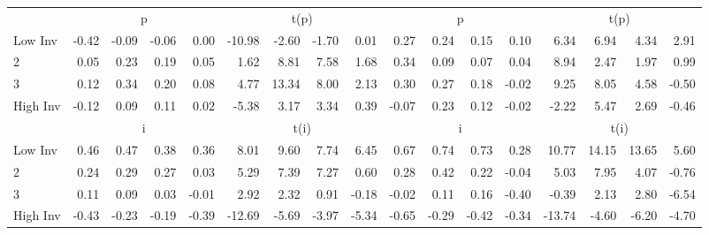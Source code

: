 \begin{table}[!ht]
\begin{tabular}{lrrrrrrrrrrrrrrrr}
  
    
      & \multicolumn{4}{c}{p} & \multicolumn{4}{c}{t(p)}
    
      & \multicolumn{4}{c}{p} & \multicolumn{4}{c}{t(p)}
    
    \\
      \cmidrule(r){2-5} \cmidrule(r){6-9} \cmidrule(r){10-13} \cmidrule(r){14-17}

    Low Inv   & -0.42  & -0.09  & -0.06  & 0.00  & -10.98  & -2.60  & -1.70  & 0.01  & 0.27  & 0.24  & 0.15  & 0.10  & 6.34  & 6.94  & 4.34  & 2.91  \\
           2  & 0.05  & 0.23  & 0.19  & 0.05  & 1.62  & 8.81  & 7.58  & 1.68  & 0.34  & 0.09  & 0.07  & 0.04  & 8.94  & 2.47  & 1.97  & 0.99  \\
           3  & 0.12  & 0.34  & 0.20  & 0.08  & 4.77  & 13.34  & 8.00  & 2.13  & 0.30  & 0.27  & 0.18  & -0.02  & 9.25  & 8.05  & 4.58  & -0.50  \\
    High Inv  & -0.12  & 0.09  & 0.11  & 0.02  & -5.38  & 3.17  & 3.34  & 0.39  & -0.07  & 0.23  & 0.12  & -0.02  & -2.22  & 5.47  & 2.69  & -0.46  \\

  
    
      & \multicolumn{4}{c}{i} & \multicolumn{4}{c}{t(i)}
    
      & \multicolumn{4}{c}{i} & \multicolumn{4}{c}{t(i)}
    
    \\
      \cmidrule(r){2-5} \cmidrule(r){6-9} \cmidrule(r){10-13} \cmidrule(r){14-17}

    Low Inv   & 0.46  & 0.47  & 0.38  & 0.36  & 8.01  & 9.60  & 7.74  & 6.45  & 0.67  & 0.74  & 0.73  & 0.28  & 10.77  & 14.15  & 13.65  & 5.60  \\
           2  & 0.24  & 0.29  & 0.27  & 0.03  & 5.29  & 7.39  & 7.27  & 0.60  & 0.28  & 0.42  & 0.22  & -0.04  & 5.03  & 7.95  & 4.07  & -0.76  \\
           3  & 0.11  & 0.09  & 0.03  & -0.01  & 2.92  & 2.32  & 0.91  & -0.18  & -0.02  & 0.11  & 0.16  & -0.40  & -0.39  & 2.13  & 2.80  & -6.54  \\
    High Inv  & -0.43  & -0.23  & -0.19  & -0.39  & -12.69  & -5.69  & -3.97  & -5.34  & -0.65  & -0.29  & -0.42  & -0.34  & -13.74  & -4.60  & -6.20  & -4.70  \\

  

  \bottomrule
\end{tabular}
\label{tbl:32_Size_BM_Inv_FF2015}
\end{table}